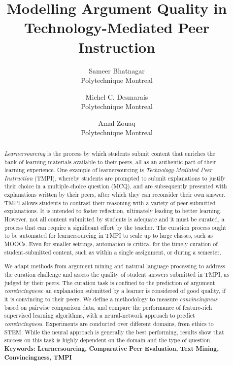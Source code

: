 \documentclass[notitlepage,12pt]{jedm}
\begin{document}
	
	\title{Modelling Argument Quality in Technology-Mediated Peer Instruction}
	\date{} %
	
	\author{
		{\large Sameer Bhatnagar}
		\\Polytechnique Montreal
	 	\and 
	 	{\large Michel C. Desmarais}
	 	\\Polytechnique Montreal
	 	\and 
	 	{\large Amal Zouaq}
 		\\Polytechnique Montreal
 }

	
	\maketitle
	
	\begin{abstract}
	\textit{Learnersourcing} is the process by which students submit content 
	that enriches the bank of learning materials available to their peers, all as 
	an 	authentic part of their learning experience.  
	One example of learnersourcing is \textit{Technology-Mediated Peer 
	Instruction} (TMPI), whereby students are prompted to submit explanations 
	to justify their choice in a multiple-choice question (MCQ), and are 
	subsequently presented with explanations written by their peers, after 
	which they can reconsider their own answer.  
	TMPI allows students to contrast their reasoning with a variety of peer-submitted explanations. 
	It is intended to foster reflection, ultimately leading to better 
	learning.  
	However, not all content submitted by students is adequate and it must be 
	curated, a process that can require a significant effort by the teacher.  
	The curation process ought to be automated for learnersourcing in TMPI to scale up to large classes, such as MOOCs.
	Even for smaller settings, automation is critical for the timely curation 
	of student-submitted content, such as within a 
	single assignment, or during a semester.
	
	We adapt methods from argument mining and natural language 
	processing to address the curation challenge and assess the quality of 
	student answers submitted in TMPI, as judged by their peers.  
	The curation task is confined to the prediction of argument 
	\textit{convincingness}: an explanation submitted by a learner is 
	considered of good quality, if it is convincing to their peers.  
	We define a methodology to measure \textit{convincingness} based on 
	pairwise comparison data, and compare the performance of feature-rich 
	supervised learning algorithms, with a neural-network approach to predict 
	\textit{convincingness}.
	Experiments are conducted over different domains, from ethics to STEM.  
	While the neural approach is generally the best performing, results show 
	that success on this task is highly dependent on the domain and the type of question.
	\\ %
		{\parindent0pt
			\textbf{Keywords: Learnersourcing, Comparative Peer Evaluation, 
			Text Mining, Convincingness, TMPI} 
		}
	\end{abstract}
\end{document}

